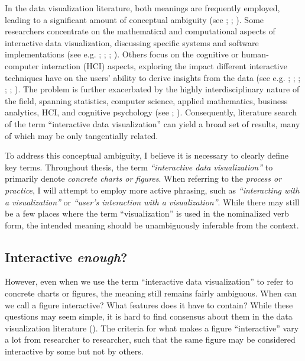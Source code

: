 \documentclass[
  openany]{book}
\theoremstyle{definition}
\theoremstyle{definition}
\theoremstyle{definition}
\theoremstyle{definition}
\theoremstyle{remark}
\begin{document}
In the data visualization literature, both meanings are frequently employed, leading to a significant amount of conceptual ambiguity (see ; ; ). Some researchers concentrate on the mathematical and computational aspects of interactive data visualization, discussing specific systems and software implementations (see e.g. ; ; ; ). Others focus on the cognitive or human-computer interaction (HCI) aspects, exploring the impact different interactive techniques have on the users' ability to derive insights from the data (see e.g. ; ; ; ; ; ). The problem is further exacerbated by the highly interdisciplinary nature of the field, spanning statistics, computer science, applied mathematics, business analytics, HCI, and cognitive psychology (see ; ). Consequently, literature search of the term ``interactive data visualization'' can yield a broad set of results, many of which may be only tangentially related.

To address this conceptual ambiguity, I believe it is necessary to clearly define key terms. Throughout thesis, the term \emph{``interactive data visualization''} to primarily denote \emph{concrete charts or figures}. When referring to the \emph{process or practice}, I will attempt to employ more active phrasing, such as \emph{``interacting with a visualization''} or \emph{``user's interaction with a visualization''}. While there may still be a few places where the term ``visualization'' is used in the nominalized verb form, the intended meaning should be unambiguously inferable from the context.

\subsection{\texorpdfstring{Interactive \emph{enough}?}{Interactive enough?}}\label{interactive-enough}

However, even when we use the term ``interactive data visualization'' to refer to concrete charts or figures, the meaning still remains fairly ambiguous. When can we call a figure interactive? What features does it have to contain? While these questions may seem simple, it is hard to find consensus about them in the data visualization literature (). The criteria for what makes a figure ``interactive'' vary a lot from researcher to researcher, such that the same figure may be considered interactive by some but not by others.
\end{document}
